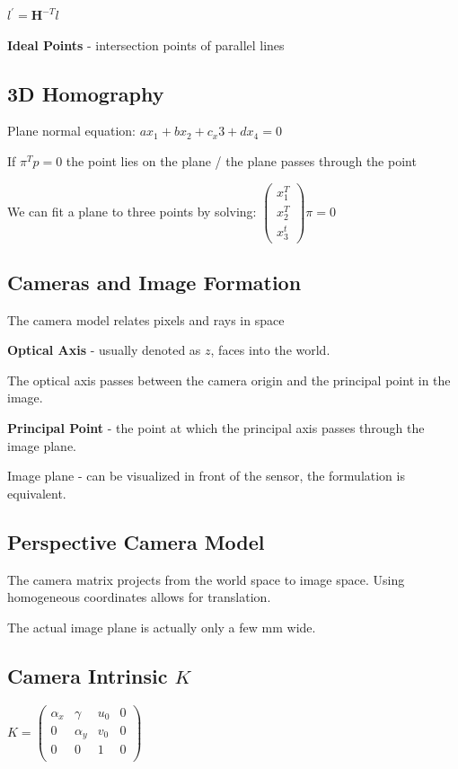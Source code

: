 $l^\prime = \mathbf{H}^{-T} l$

\textbf{Ideal Points} - intersection points of parallel lines

\subsection{3D Homography}

Plane normal equation: $ax_1 + bx_2 + c_x3 + d x_4 = 0$ 

If $\pi^T p = 0$ the point lies on the plane / the plane passes through the point

We can fit a plane to three points by solving:
$\left( \begin{matrix} x_1^T \\ x_2^T \\ x_3^t \end{matrix} \right) \pi = 0 $

\subsection{Cameras and Image Formation}

The camera model relates pixels and rays in space

\textbf{Optical Axis} - usually denoted as $z$, faces into the world.

The optical axis passes between the camera origin and the principal point in the image.

\textbf{Principal Point} - the point at which the principal axis passes through the image plane.

Image plane - can be visualized in front of the sensor, the formulation is equivalent.


\subsection{Perspective Camera Model}
The camera matrix projects from the world space to image space. Using homogeneous coordinates allows for translation.

The actual image plane is actually only a few mm wide.

\subsection{Camera Intrinsic $K$}

$K = \left( \begin{matrix} 
\alpha_x & \gamma & u_0 & 0 \\
0 & \alpha_y  & v_0 & 0 \\
0 & 0 &  1 & 0 \\
\end{matrix}
\right) $

